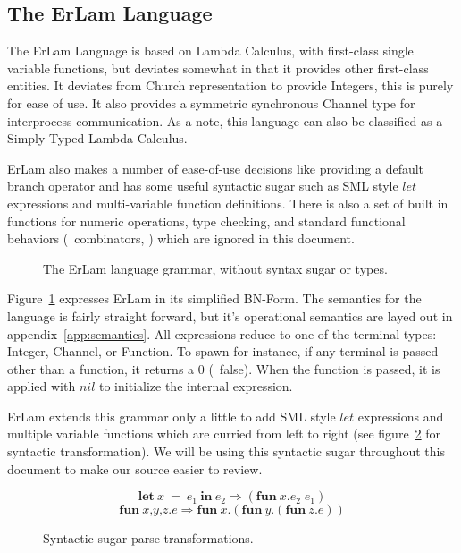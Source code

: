\subsection{The ErLam Language}\label{sec:the erlam language}

The ErLam Language is based on Lambda Calculus, with first-class single 
variable functions, but deviates somewhat in that it provides other first-class 
entities. It deviates from Church representation to provide Integers, this is
purely for ease of use. It also provides a symmetric synchronous Channel type 
for interprocess communication. As a note, this language can also be classified 
as a Simply-Typed Lambda Calculus.

ErLam also makes a number of ease-of-use decisions like providing a default 
branch operator and has some useful syntactic sugar such as SML style $let$ 
expressions and multi-variable function definitions. There is also a set of
built in functions for numeric operations, type checking, and standard 
functional behaviors (\eg~combinators, \etc) which are ignored in this 
document.

\begin{figure} %
\centering

\caption{The ErLam language grammar, without syntax sugar or types.}
\label{fig:grammer}
\end{figure}

Figure~\ref{fig:grammer} expresses ErLam in its simplified BN-Form. The 
semantics for the language is fairly straight forward, but it's operational 
semantics are layed out in appendix~\ref{app:semantics}. All expressions reduce
to one of the terminal types: Integer, Channel, or Function. To spawn for 
instance, if any terminal is passed other than a function, it returns a $0$
(\eg~false). When the function is passed, it is applied with $nil$ to 
initialize the internal expression. 

ErLam extends this grammar only a little to add SML style $let$ expressions and
multiple variable functions which are curried from left to right (see 
figure~\ref{fig:sugar-transform} for syntactic transformation). We will be using
this syntactic sugar throughout this document to make our source easier to 
review.

\begin{figure}
    \centering
    \[
        \textbf{let}\: x\: =\: e_1\: \textbf{in}\: e_2
        \Rightarrow
        (\textbf{fun}\: x.e_2\; e_1)
    \]
    \[
        \textbf{fun}\: \textit{x,y,z} . \textit{e}
        \Rightarrow
        \textbf{fun}\: \textit{x} . (\textbf{fun}\: \textit{y} . (\textbf{fun}\: \textit{z} . \textit{e} ))
    \]
    \caption{Syntactic sugar parse transformations.}
    \label{fig:sugar-transform}
\end{figure}


